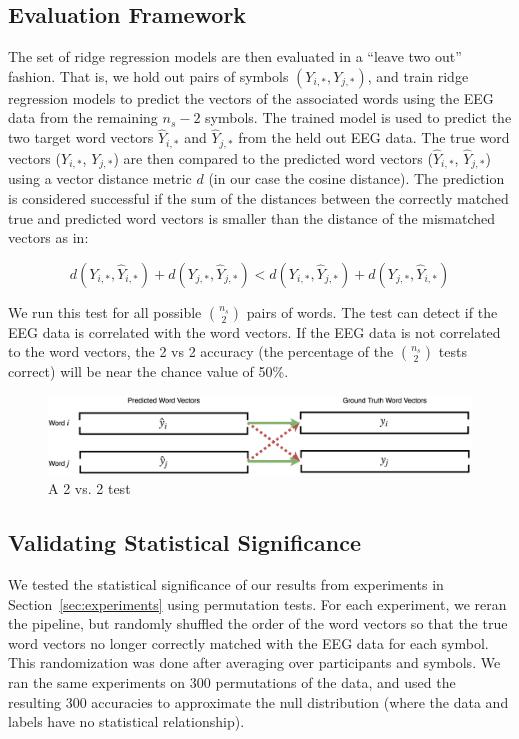 \subsection{Evaluation Framework}
The set of ridge regression models are then evaluated in a ``leave two out'' fashion. That is, we hold out pairs of symbols $(Y_{i,*}, Y_{j,*})$, and train ridge regression models to predict the vectors of the associated words using the EEG data from the remaining $n_s-2$ symbols.  The trained model is used to predict the two target word vectors $\hat{Y}_{i,*}$ and $\hat{Y}_{j,*}$ from the held out EEG data. The true word vectors ($Y_{i,*}$, $Y_{j,*}$) are then compared to the predicted word vectors ($\hat{Y}_{i,*}$, $\hat{Y}_{j,*}$) using a vector distance metric $d$ (in our case the cosine distance). The prediction is considered successful if the sum of the distances between the correctly matched true and predicted word vectors is smaller than the distance of the mismatched vectors as in: 
  
\begin{equation}
  d(Y_{i,*}, \hat{Y}_{i,*}) + d(Y_{j,*}, \hat{Y}_{j,*}) < d(Y_{i,*}, \hat{Y}_{j,*}) + d(Y_{j,*}, \hat{Y}_{i,*})
  \label{eq:2vs2}
\end{equation}
  
\noindent We run this test for all possible ${\binom{n_s}{2}}$ pairs of words. The \tvt test can detect if the EEG data is correlated with the word vectors. If the EEG data is not correlated to the word vectors, the 2 vs 2 accuracy (the percentage of the ${\binom{n_s}{2}}$ \tvt tests correct) will be  near the chance value of 50\%.

\begin{figure}[t]
  \centering
  \includegraphics[width=\textwidth]{figures/2vs2}
  \caption{A 2 vs. 2 test}
  \label{fig:2vs2}
\end{figure}

\subsection{Validating Statistical Significance}
We tested the statistical significance of our results from experiments in Section~\ref{sec:experiments} using permutation tests. For each experiment, we reran the pipeline, but randomly shuffled the order of the word vectors so that the true word vectors no longer correctly matched with the EEG data for each symbol. This randomization was done after averaging over participants and symbols. We ran the same experiments on 300 permutations of the data, and used the resulting 300 \tvt accuracies to approximate the null distribution (where the data and labels have no statistical relationship). 
  
